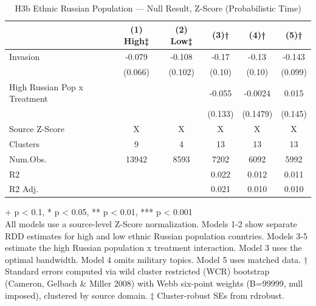 \begin{table}[t]
\caption{\label{tab:table-05b}H3b Ethnic Russian Population — Null Result, Z-Score (Probabilistic Time)}
\fontsize{12.0pt}{14.0pt}\selectfont
\begin{tabular*}{\linewidth}{@{\extracolsep{\fill}}lccccc}
\toprule
  & (1) High‡ & (2) Low‡ & (3)† & (4)† & (5)† \\ 
\midrule\addlinespace[2.5pt]
Invasion & -0.079 & -0.108 & -0.17 & -0.13 & -0.143 \\ 
 & (0.066) & (0.102) & (0.10) & (0.10) & (0.099) \\ 
High Russian Pop x Treatment &  &  & -0.055 & -0.0024 & 0.015 \\ 
{} & {} & {} & {(0.133)} & {(0.1479)} & {(0.145)} \\ 
Source Z-Score & X & X & X & X & X \\ 
Clusters & 9 & 4 & 13 & 13 & 13 \\ 
Num.Obs. & 13942 & 8593 & 7202 & 6092 & 5992 \\ 
R2 &  &  & 0.022 & 0.012 & 0.011 \\ 
R2 Adj. &  &  & 0.021 & 0.010 & 0.010 \\ 
\bottomrule
\end{tabular*}
\begin{minipage}{\linewidth}
\vspace{.05em}
+ p < 0.1, * p < 0.05, ** p < 0.01, *** p < 0.001\\
All models use a source-level Z-Score normalization. Models 1-2 show separate
RDD estimates for high and low ethnic Russian population countries. Models 3-5
estimate the high Russian population x treatment interaction. Model 3 uses the
optimal bandwidth. Model 4 omits military topics. Model 5 uses matched data. †
Standard errors computed via wild cluster restricted (WCR) bootstrap (Cameron,
Gelbach \& Miller 2008) with Webb six-point weights (B=99999, null imposed),
clustered by source domain. ‡ Cluster-robust SEs from rdrobust.\\
\end{minipage}
\end{table}

